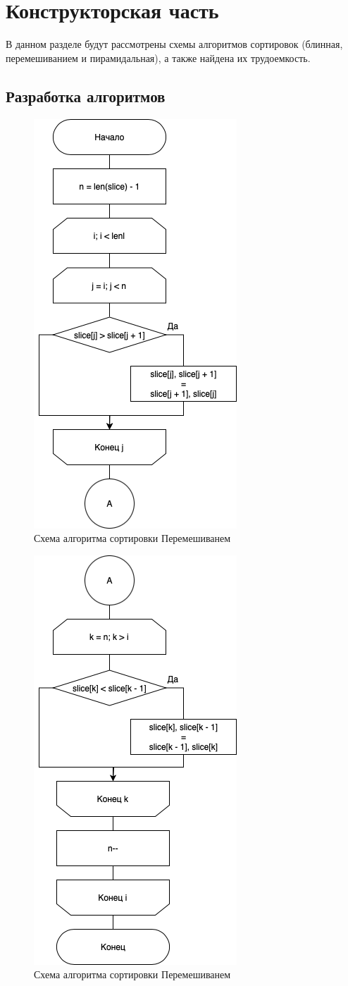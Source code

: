\chapter{Конструкторская часть}

В данном разделе будут рассмотрены схемы алгоритмов сортировок 
(блинная, перемешиванием и пирамидальная), а также найдена их трудоемкость.

\section{Разработка алгоритмов}

\begin{figure}[h]
    \centering
    \includegraphics[width=0.4\linewidth]{img/sheker1.jpg}
    \caption{Схема алгоритма сортировки Перемешиванем}
    \label{fig:shecker}
\end{figure}

\begin{figure}[h]
    \centering
    \includegraphics[width=0.4\linewidth]{img/sheker2.jpg}
    \caption{Схема алгоритма сортировки Перемешиванем}
\end{figure}

